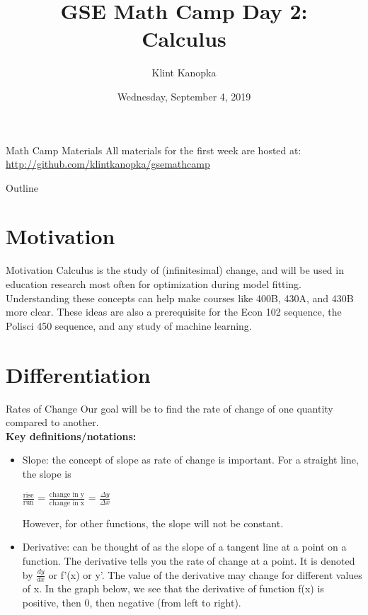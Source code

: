 \documentclass[]{beamer}
\title[GSE Math Camp: Day 2]{GSE Math Camp Day 2: \\ Calculus}
\author{Klint Kanopka}
\institute{kkanopka@stanford.edu}
\date{Wednesday, September 4, 2019}
\begin{document}
    \begin{frame}
      \titlepage
    \end{frame}

    \begin{frame}{Math Camp Materials}
        All materials for the first week are hosted at:
        \url{http://github.com/klintkanopka/gsemathcamp}
    \end{frame}
    
    \begin{frame}{Outline}
      \tableofcontents
    \end{frame}

\section{Motivation}
    
    \begin{frame}{Motivation}
        Calculus is the study of (infinitesimal) change, and will be used in education research most often for optimization during model fitting. Understanding these concepts can help make courses like 400B, 430A, and 430B more clear. These ideas are also a prerequisite for the Econ 102 sequence, the Polisci 450 sequence, and any study of machine learning.
    \end{frame}

\section{Differentiation}
    \begin{frame}{Rates of Change}
        Our goal will be to find the rate of change of one quantity compared to another. \\
        \textbf{Key definitions/notations:} 
        \begin{itemize}
            \item<2-> Slope: the concept of slope as rate of change is important. For a straight line, the slope is \begin{center} {\LARGE $\frac{\text{rise}}{\text{run}} $} = {\LARGE $\frac{\text{change in y}}{\text{change in x}} $} = {\LARGE $\frac{\Delta{y}}{\Delta{x}}$ }\end{center}
            However, for other functions, the slope will not be constant.
        \item<3-> Derivative: can be thought of as the slope of a tangent line at a point on a function. The derivative tells you the rate of change at a point. It is denoted by {\LARGE $ \frac{\textit{dy}}{\textit{dx}}$} or f'(x) or y'. The value of the derivative may change for different values of x. In the graph below, we see that the derivative of function f(x) is positive, then 0, then negative (from left to right). 
    \end{itemize}
    \end{frame}
\end{document}
